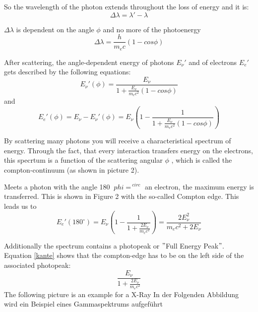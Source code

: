 
So the wavelength of the photon extends throughout the loss of energy and it is:
	\begin{equation}
	\Delta \lambda = \lambda ' - \lambda
	\end{equation}

$\Delta \lambda$ is dependent on the angle $\phi$ and no more of the photoenergy
	\begin{equation}
	\Delta \lambda = \frac{h}{m_{e} c}(1-cos \phi)
	\end{equation}

After scattering, the angle-dependent energy of photons $E_{\nu}'$ and of electrons $E_{e}'$ gets described by the following equations:
	\begin{equation}
	E_{\nu}'(\phi) = \frac{E_{\nu}}{1+\frac{E_{\nu}}{m_{e}c^{2}}(1-cos 			\phi)}
	\end{equation}
and
	\begin{equation}
	E_{e}'(\phi) = E_{\nu}-E_{\nu}'(\phi) = E_{\nu}\left(1-\frac{1}{1+\frac{E_{\nu}}{m_{e}c^{2}}(1-cos \phi)}\right)
	\end{equation}

By scattering many photons you will receive a characteristical spectrum of energy. Through the fact, that every interaction transfers energy on the electrons, this specrtum is a function of the scattering angular $\phi$ , which is called the compton-continuum (as shown in picture 2).


Meets a photon with the angle 180 $ \ phi = ^ {\ circ} $ an electron, the maximum energy is transferred. This is shown in Figure 2 with the so-called Compton edge. This leads us to	
	\begin{equation}
	\label{kante}
	E_{e}'(180^{\circ}) = E_{\nu} \left(1-\frac{1}{1+\frac{2E_{\nu}}{m_{e}c^{2}}}\right) = \frac{2E_{\nu}^{2}}{m_{e}c^{2} +2E_{\nu}}
	\end{equation}

Additionally the spectrum contains a photopeak or $"$Full Energy Peak$"$. Equation \eqref{kante} shows that the compton-edge has to be on the left side of the associated photopeak:
	\begin{equation}
	\frac{E_{\nu}}{1+\frac{2E_{\nu}}{m_{e}c^{2}}}
	\end{equation}
The following picture is an example for a X-Ray In der Folgenden Abbildung wird ein Beispiel eines Gammaspektrums aufgeführt\\

